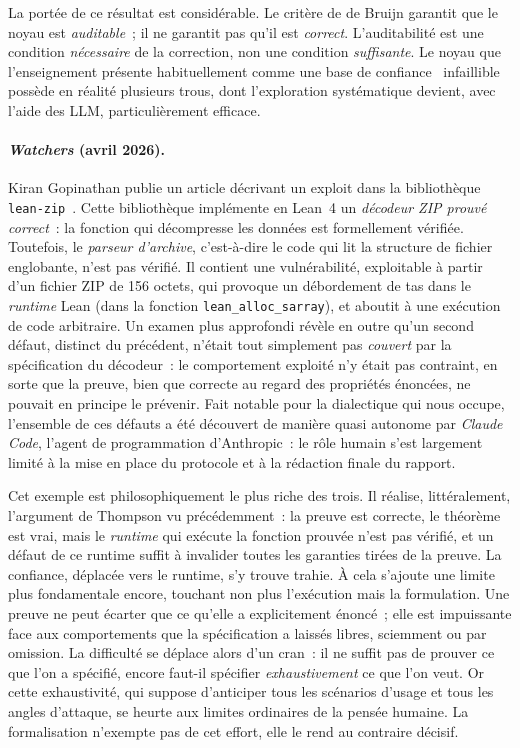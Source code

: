 \documentclass[11pt,a4paper]{article}
\begin{document}
La portée de ce résultat est considérable. Le critère de de Bruijn garantit que le noyau est \emph{auditable}~; il ne garantit pas qu'il est \emph{correct}. L'auditabilité est une condition \emph{nécessaire} de la correction, non une condition \emph{suffisante}. Le noyau que l'enseignement présente habituellement comme une \og base de confiance~\fg{} infaillible possède en réalité plusieurs trous, dont l'exploration systématique devient, avec l'aide des LLM, particulièrement efficace.

\paragraph{\emph{Watchers} (avril 2026).} Kiran Gopinathan publie un article décrivant un exploit dans la bibliothèque \texttt{lean-zip}~\parencite{gopinathan2026watchers}. Cette bibliothèque implémente en Lean~4 un \emph{décodeur ZIP prouvé correct}~: la fonction qui décompresse les données est formellement vérifiée. Toutefois, le \emph{parseur d'archive}, c'est-à-dire le code qui lit la structure de fichier englobante, n'est pas vérifié. Il contient une vulnérabilité, exploitable à partir d'un fichier ZIP de 156 octets, qui provoque un débordement de tas dans le \emph{runtime} Lean (dans la fonction \texttt{lean\_alloc\_sarray}), et aboutit à une exécution de code arbitraire. Un examen plus approfondi révèle en outre qu'un second défaut, distinct du précédent, n'était tout simplement pas \emph{couvert} par la spécification du décodeur~: le comportement exploité n'y était pas contraint, en sorte que la preuve, bien que correcte au regard des propriétés énoncées, ne pouvait en principe le prévenir. Fait notable pour la dialectique qui nous occupe, l'ensemble de ces défauts a été découvert de manière quasi autonome par \emph{Claude Code}, l'agent de programmation d'Anthropic~: le rôle humain s'est largement limité à la mise en place du protocole et à la rédaction finale du rapport.

Cet exemple est philosophiquement le plus riche des trois. Il réalise, littéralement, l'argument de Thompson vu précédemment~: la preuve est correcte, le théorème est vrai, mais le \emph{runtime} qui exécute la fonction prouvée n'est pas vérifié, et un défaut de ce runtime suffit à invalider toutes les garanties tirées de la preuve. La confiance, déplacée vers le runtime, s'y trouve trahie. À cela s'ajoute une limite plus fondamentale encore, touchant non plus l'exécution mais la formulation. Une preuve ne peut écarter que ce qu'elle a explicitement énoncé~; elle est impuissante face aux comportements que la spécification a laissés libres, sciemment ou par omission. La difficulté se déplace alors d'un cran~: il ne suffit pas de prouver ce que l'on a spécifié, encore faut-il spécifier \emph{exhaustivement} ce que l'on veut. Or cette exhaustivité, qui suppose d'anticiper tous les scénarios d'usage et tous les angles d'attaque, se heurte aux limites ordinaires de la pensée humaine. La formalisation n'exempte pas de cet effort, elle le rend au contraire décisif.
\end{document}
